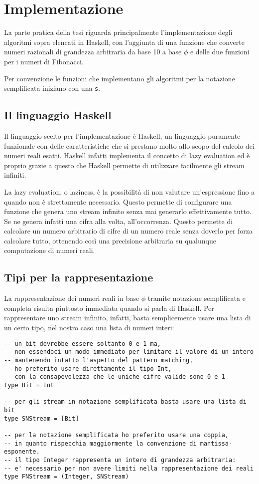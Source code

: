 \documentclass[Lau]{sapthesis}
\newcommand{\code}[1]{\colorbox{light-gray}{\texttt{#1}}}
\begin{document}
\chapter{Implementazione}
La parte pratica della tesi riguarda principalmente l'implementazione degli algoritmi sopra elencati in Haskell, con l'aggiunta di una funzione che converte numeri razionali di grandezza arbitraria da base 10 a base $\phi$ e delle due funzioni per i numeri di Fibonacci.

Per convenzione le funzioni che implementano gli algoritmi per la notazione semplificata iniziano con una \code{s}.


\section{Il linguaggio Haskell}
Il linguaggio scelto per l'implementazione è Haskell, un linguaggio puramente funzionale con delle caratteristiche che si prestano molto allo scopo del calcolo dei numeri reali esatti. Haskell infatti implementa il concetto di lazy evaluation ed è proprio grazie a questo che Haskell permette di utilizzare facilmente gli stream infiniti.

La lazy evaluation, o laziness, è la possibilità di non valutare un'espressione fino a quando non è strettamente necessario. Questo permette di configurare una funzione che genera uno stream infinito senza mai generarlo effettivamente tutto. Se ne genera infatti una cifra alla volta, all'occorrenza. Questo permette di calcolare un numero arbitrario di cifre di un numero reale senza doverlo per forza calcolare tutto, ottenendo così una precisione arbitraria su qualunque computazione di numeri reali.


\section{Tipi per la rappresentazione}
La rappresentazione dei numeri reali in base $\phi$ tramite notazione semplificata e completa risulta piuttosto immediata quando si parla di Haskell. Per rappresentare uno stream infinito, infatti, basta semplicemente usare una lista di un certo tipo, nel nostro caso una lista di numeri interi:
\begin{verbatim}
-- un bit dovrebbe essere soltanto 0 e 1 ma,
-- non essendoci un modo immediato per limitare il valore di un intero
-- mantenendo intatto l'aspetto del pattern matching,
-- ho preferito usare direttamente il tipo Int,
-- con la consapevolezza che le uniche cifre valide sono 0 e 1
type Bit = Int

-- per gli stream in notazione semplificata basta usare una lista di bit
type SNStream = [Bit]

-- per la notazione semplificata ho preferito usare una coppia,
-- in quanto rispecchia maggiormente la convenzione di mantissa-esponente.
-- il tipo Integer rappresenta un intero di grandezza arbitraria:
-- e' necessario per non avere limiti nella rappresentazione dei reali
type FNStream = (Integer, SNStream)
\end{verbatim}
\end{document}
